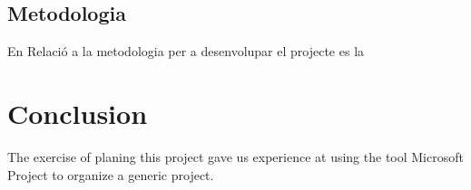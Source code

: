 \documentclass[conference,onecolumn, catalan]{IEEEtran}
\begin{document}
\subsection{Metodologia}

En Relació a la metodologia per a desenvolupar el projecte es la 


\section{Conclusion}

The exercise of planing this project gave us experience at using the tool Microsoft Project to organize a generic project.





\end{document}
